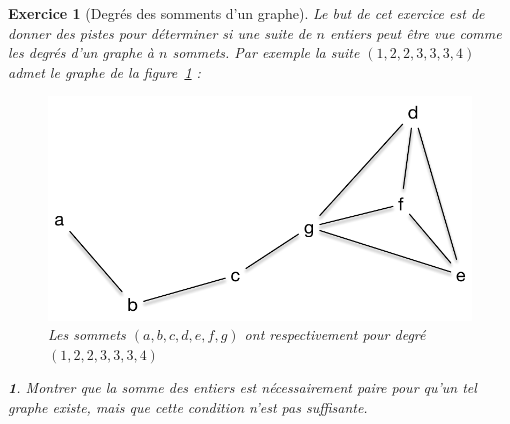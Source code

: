 \documentclass{article}
\theoremstyle{exostyle}
\newtheorem{exo}{Exercice}
\theoremstyle{partiestyle}
\newtheorem{partie}{}[exo]
\theoremstyle{questionstyle}
\begin{document}
\begin{exo}[Degrés des somments d'un graphe]
	Le but de cet exercice est de donner des pistes pour déterminer si une suite de $n$ entiers peut être vue comme les degrés d'un graphe à $n$ sommets. Par exemple la suite $(1, 2, 2, 3, 3, 3, 4)$ admet le graphe de la figure~\ref{degres} :
	
	\begin{figure}[h!]
		\begin{center}
			\includegraphics[scale=.35]{degrés-1.pdf}
		\end{center}
		\caption{Les sommets $(a,b, c, d, e, f, g)$ ont respectivement pour degré $(1, 2, 2, 3, 3, 3, 4)$\label{degres}}
	\end{figure}
\begin{partie}
Montrer que la somme des entiers est nécessairement paire pour qu'un tel graphe existe, mais que cette condition n'est pas suffisante.
\end{partie}


\end{exo}
\end{document}
